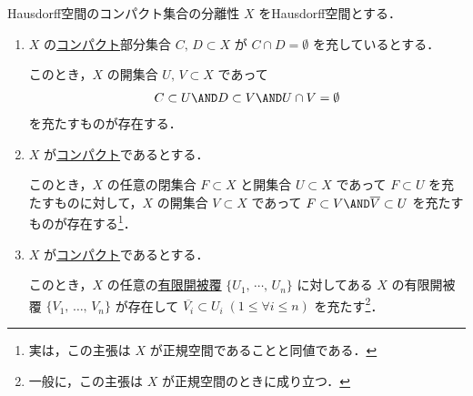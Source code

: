 \documentclass[algtopo_main]{subfiles}
\begin{document}
\begin{mylem}[label=lem:Hausdorff-compact-separation]{Hausdorff空間のコンパクト集合の分離性}
    $X$ をHausdorff空間とする．
    \begin{enumerate}
        \item $X$ の\hyperref[def:compact]{コンパクト}部分集合 $C,\, D \subset X$ が $C \cap D = \emptyset$ を充しているとする．
        
        このとき，$X$ の開集合 $U,\, V \subset X$ であって
        \begin{align}
            C \subset U \AND D \subset V \AND U \cap V = \emptyset
        \end{align}
        を充たすものが存在する．
        \item $X$ が\hyperref[def:compact]{コンパクト}であるとする．
        
        このとき，$X$ の任意の閉集合 $F \subset X$ と開集合 $U \subset X$ であって $F \subset U$ を充たすものに対して，$X$ の開集合 $V \subset X$ であって $F \subset V \AND \overline{V} \subset U$ を充たすものが存在する\footnote{実は，この主張は $X$ が正規空間であることと同値である．}．
        \item $X$ が\hyperref[def:compact]{コンパクト}であるとする．
        
        このとき，$X$ の任意の\underline{有限}\hyperref[def:cover]{開被覆} $\{U_1,\, \cdots ,\, U_n\}$ に対してある $X$ の有限開被覆 $\{V_1,\, \dots ,\, V_n\}$ が存在して $\overline{V_i} \subset U_i\; (1 \le \forall i \le n)$ を充たす\footnote{一般に，この主張は $X$ が正規空間のときに成り立つ．}．
    \end{enumerate}
\end{mylem}
\end{document}
